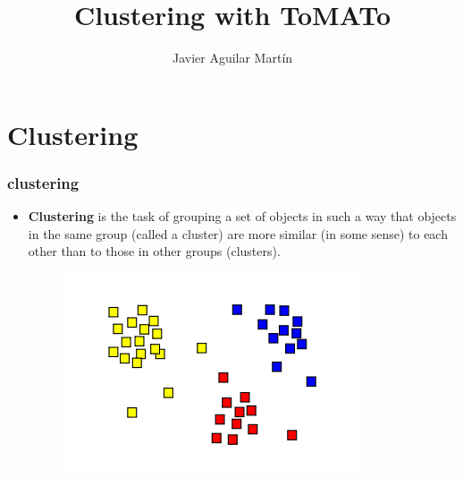 \documentclass{beamer}
\title{Clustering with ToMATo}
\author{Javier Aguilar Mart\'in}
\institute{BIREP}
\date{}
\theoremstyle{definition}
\begin{document}
\frame{\titlepage}





\newcommand{\seti}{\setcounter{saveenumi}{\value{enumi}}}
\newcommand{\conti}{\setcounter{enumi}{\value{saveenumi}}}

\makeatletter
\newcommand{\xRightarrow}[2][]{\ext@arrow 0359\Rightarrowfill@{#1}{#2}}
\makeatother




\section{Clustering}



\begin{frame}
\frametitle{clustering}
\begin{itemize}
\item \textbf{Clustering} is the task of grouping a set of objects in such a way that objects in the same group (called a cluster) are more similar (in some sense) to each other than to those in other groups (clusters). %

\begin{figure}
\includegraphics[scale=0.5]{cluster}
\end{figure}
\end{itemize}
\end{frame}
\end{document}

